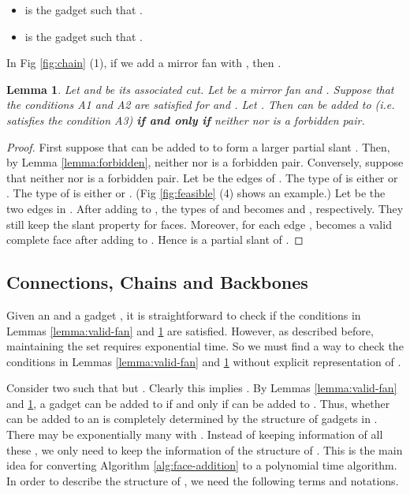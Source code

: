 \documentclass[11pt]{article}
\newtheorem{lemma}[figure]{Lemma}
\begin{document}
\begin{itemize}
\item  is the gadget such that .
\item  is the gadget such that .
\end{itemize}

In Fig \ref{fig:chain} (1), if we add a mirror fan  with
, then .


\begin{lemma}\label{lemma:mirror-fan}
Let  and  be its associated cut.
Let  be a mirror fan and . Suppose that the conditions
A1 and A2 are satisfied for  and . Let
.
Then  can be added to  (i.e.  satisfies the condition A3)
{\bf if and only if} neither  nor  is a forbidden pair.
\end{lemma}

\begin{proof}
First suppose that  can be added to  to form a larger partial slant .
Then, by Lemma \ref{lemma:forbidden}, neither  nor 
is a forbidden pair.
Conversely, suppose that neither  nor 
is a forbidden pair. Let  be the edges of .
The type of  is either  or .
The type of  is either  or .
(Fig \ref{fig:feasible} (4) shows an example.)
Let  be the two edges in .
After adding  to , the types of  and
 becomes  and , respectively.
They still keep the slant property for  faces. Moreover, for each
edge ,  becomes
a valid complete  face after adding  to . Hence
  is a partial slant  of .
\end{proof}

\subsection{Connections, Chains and Backbones}
\label{subsec:chains}

Given an  and a gadget , it is straightforward to check
if the conditions in Lemmas \ref{lemma:valid-fan} and \ref{lemma:mirror-fan}
are satisfied. However, as described before, maintaining the set 
requires exponential time. So we must find a way to check the conditions in
Lemmas \ref{lemma:valid-fan} and \ref{lemma:mirror-fan} without explicit
representation of .

Consider two  such that  but
.
Clearly this implies .
By Lemmas \ref{lemma:valid-fan} and \ref{lemma:mirror-fan},
a gadget  can be added to  if and only if  can be added to .
Thus, whether  can be added to an  is completely determined
by the structure of gadgets in . There may be exponentially
many  with . Instead of
keeping information of all these , we only need to keep the information
of the structure of . This is the main idea for converting
Algorithm \ref{alg:face-addition} to a polynomial time algorithm.
In order to describe the structure of ,
we need the following terms and notations.
\end{document}
